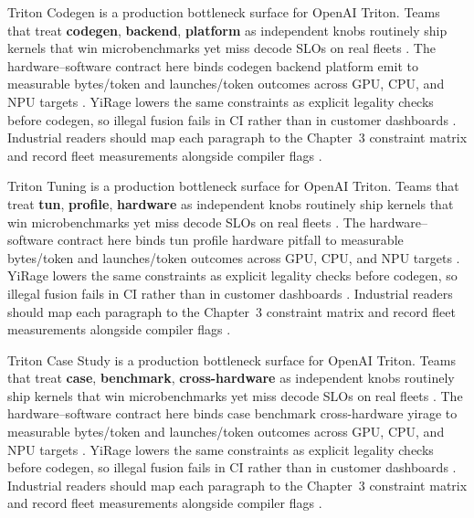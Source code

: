 Triton Codegen is a production bottleneck surface for OpenAI Triton. Teams that treat \textbf{codegen}, \textbf{backend}, \textbf{platform} as independent knobs routinely ship kernels that win microbenchmarks yet miss decode SLOs on real fleets \citep{semianalysis2024tma,dlbook}. The hardware--software contract here binds codegen backend platform emit to measurable bytes/token and launches/token outcomes across GPU, CPU, and NPU targets \citep{amd2024xdna,dao2022flashattention}. YiRage lowers the same constraints as explicit legality checks before codegen, so illegal fusion fails in CI rather than in customer dashboards \citep{amd2024aie,kwon2023vllm}. Industrial readers should map each paragraph to the Chapter~3 constraint matrix and record fleet measurements alongside compiler flags \citep{dlbook,nvidia2024cudagraphs}.

Triton Tuning is a production bottleneck surface for OpenAI Triton. Teams that treat \textbf{tun}, \textbf{profile}, \textbf{hardware} as independent knobs routinely ship kernels that win microbenchmarks yet miss decode SLOs on real fleets \citep{amd2024xdna,dao2022flashattention}. The hardware--software contract here binds tun profile hardware pitfall to measurable bytes/token and launches/token outcomes across GPU, CPU, and NPU targets \citep{amd2024aie,kwon2023vllm}. YiRage lowers the same constraints as explicit legality checks before codegen, so illegal fusion fails in CI rather than in customer dashboards \citep{dlbook,nvidia2024cudagraphs}. Industrial readers should map each paragraph to the Chapter~3 constraint matrix and record fleet measurements alongside compiler flags \citep{dao2022flashattention,liu2024deepseekv3}.

Triton Case Study is a production bottleneck surface for OpenAI Triton. Teams that treat \textbf{case}, \textbf{benchmark}, \textbf{cross-hardware} as independent knobs routinely ship kernels that win microbenchmarks yet miss decode SLOs on real fleets \citep{amd2024aie,kwon2023vllm}. The hardware--software contract here binds case benchmark cross-hardware yirage to measurable bytes/token and launches/token outcomes across GPU, CPU, and NPU targets \citep{dlbook,nvidia2024cudagraphs}. YiRage lowers the same constraints as explicit legality checks before codegen, so illegal fusion fails in CI rather than in customer dashboards \citep{dao2022flashattention,liu2024deepseekv3}. Industrial readers should map each paragraph to the Chapter~3 constraint matrix and record fleet measurements alongside compiler flags \citep{kwon2023vllm,patel2025llminference}.

